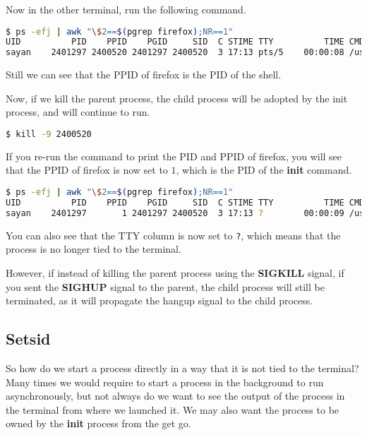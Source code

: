 Now in the other terminal, run the following command.

\begin{lstlisting}[language=bash]
$ ps -efj | awk "\$2==$(pgrep firefox);NR==1"
UID          PID    PPID    PGID     SID  C STIME TTY          TIME CMD
sayan    2401297 2400520 2401297 2400520  3 17:13 pts/5    00:00:08 /usr/lib/firefox/firefox
\end{lstlisting}

Still we can see that the PPID of firefox is the PID of the shell.

Now, if we kill the parent process, the child process will be adopted by the
init process, and will continue to run.

\begin{lstlisting}[language=bash]
$ kill -9 2400520
\end{lstlisting}

If you re-run the command to print the PID and PPID of firefox, you will see
that the PPID of firefox is now set to $1$, which is the PID of the \textbf{init}
command.

\begin{lstlisting}[language=bash]
$ ps -efj | awk "\$2==$(pgrep firefox);NR==1"
UID          PID    PPID    PGID     SID  C STIME TTY          TIME CMD
sayan    2401297       1 2401297 2400520  3 17:13 ?        00:00:09 /usr/lib/firefox/firefox
\end{lstlisting}

You can also see that the TTY column is now set to \texttt{?}, which means that
the process is no longer tied to the terminal.

However, if instead of killing the parent process using the \textbf{SIGKILL}
signal, if you sent the \textbf{SIGHUP} signal to the parent, the child process
will still be terminated, as it will propagate the hangup signal to the child process.


\subsection{Setsid}

So how do we start a process directly in a way that it is not tied to the terminal?
Many times we would require to start a process in the background to run
asynchronously, but not always do we want to see the output of the process
in the terminal from where we launched it. We may also want the process
to be owned by the \textbf{init} process from the get go.


